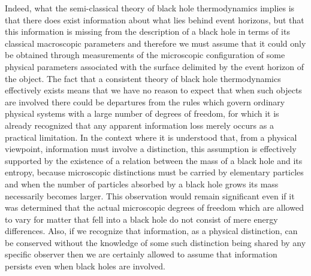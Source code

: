 \documentclass[notitlepage,12pt]{report}
\begin{document}
Indeed, what the semi-classical theory of black hole thermodynamics implies is that there does exist information about what lies behind event horizons, but that this information is missing from the description of a black hole in terms of its classical macroscopic parameters and therefore we must assume that it could only be obtained through measurements of the microscopic configuration of some physical parameters associated with the surface delimited by the event horizon of the object. The fact that a consistent theory of black hole thermodynamics effectively exists means that we have no reason to expect that when such objects are involved there could be departures from the rules which govern ordinary physical systems with a large number of degrees of freedom, for which it is already recognized that any apparent information loss merely occurs as a practical limitation. In the context where it is understood that, from a physical viewpoint, information must involve a distinction, this assumption is effectively supported by the existence of a relation between the mass of a black hole and its entropy, because microscopic distinctions must be carried by elementary particles and when the number of particles absorbed by a black hole grows its mass necessarily becomes larger. This observation would remain significant even if it was determined that the actual microscopic degrees of freedom which are allowed to vary for matter that fell into a black hole do not consist of mere energy differences. Also, if we recognize that information, as a physical distinction, can be conserved without the knowledge of some such distinction being shared by any specific observer then we are certainly allowed to assume that information persists even when black holes are involved.
\end{document}
